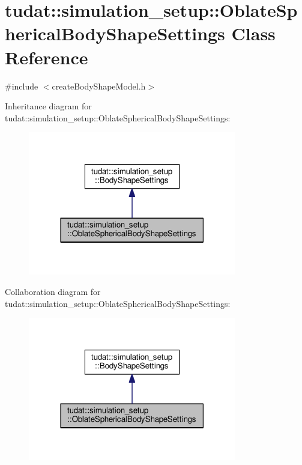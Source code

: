 \hypertarget{classtudat_1_1simulation__setup_1_1OblateSphericalBodyShapeSettings}{}\section{tudat\+:\+:simulation\+\_\+setup\+:\+:Oblate\+Spherical\+Body\+Shape\+Settings Class Reference}
\label{classtudat_1_1simulation__setup_1_1OblateSphericalBodyShapeSettings}


{\ttfamily \#include $<$create\+Body\+Shape\+Model.\+h$>$}



Inheritance diagram for tudat\+:\+:simulation\+\_\+setup\+:\+:Oblate\+Spherical\+Body\+Shape\+Settings\+:
\nopagebreak
\begin{figure}[H]
\begin{center}
\leavevmode
\includegraphics[width=258pt]{classtudat_1_1simulation__setup_1_1OblateSphericalBodyShapeSettings__inherit__graph}
\end{center}
\end{figure}


Collaboration diagram for tudat\+:\+:simulation\+\_\+setup\+:\+:Oblate\+Spherical\+Body\+Shape\+Settings\+:
\nopagebreak
\begin{figure}[H]
\begin{center}
\leavevmode
\includegraphics[width=258pt]{classtudat_1_1simulation__setup_1_1OblateSphericalBodyShapeSettings__coll__graph}
\end{center}
\end{figure}
